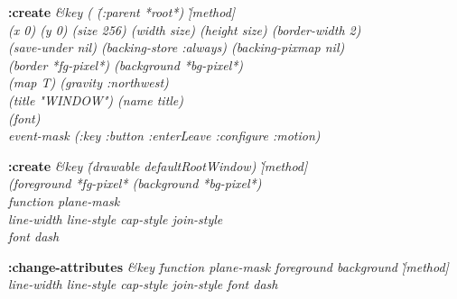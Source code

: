 {\newpage
\clearpage
\samepage 
}

{\newpage
\clearpage
\samepage 
\begin{figure}\begin{center}
\end{center}

\end{figure}
}

{\newpage
\clearpage
\samepage 
\begin{emtabbing}{\bf :create} 
\it \&key ( \= (:parent *root*) \` [method] \\  
\> (x 0) (y 0) (size 256) (width size) (height size) (border-width 2) \\  
\> (save-under nil) (backing-store :always) (backing-pixmap nil)\\  
\> (border *fg-pixel*) (background *bg-pixel*) \\  
\> (map T) (gravity :northwest) \\  
\> (title "WINDOW") (name title) \\  
\> (font) \\  
\> event-mask (:key :button :enterLeave :configure :motion)
\rm
\end{emtabbing}
}

{\newpage
\clearpage
\samepage 
\begin{emtabbing}{\bf :create} 
\it \&key \= (drawable defaultRootWindow) \` [method]\\  
\> (foreground *fg-pixel* (background *bg-pixel*) \\  
\> function plane-mask \\  
\> line-width line-style cap-style join-style \\  
\> font dash \\  
\rm
\end{emtabbing}
}

{\newpage
\clearpage
\samepage 
\begin{emtabbing}{\bf :change-attributes} 
\it \&key \= function plane-mask foreground background
\`[method]\\  
\>line-width line-style cap-style join-style font dash
\rm
\end{emtabbing}
}

